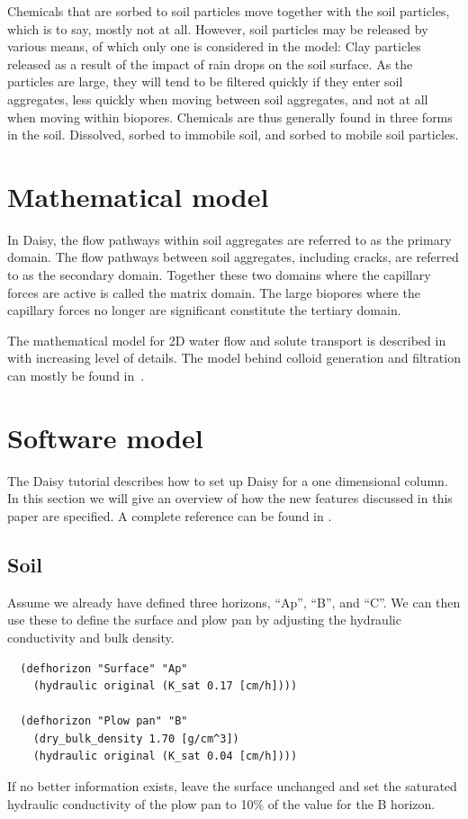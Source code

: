 \documentclass[a4paper]{article}
\begin{document}
Chemicals that are sorbed to soil particles move together with the
soil particles, which is to say, mostly not at all.  However, soil
particles may be released by various means, of which only one is
considered in the model: Clay particles released as a result of the
impact of rain drops on the soil surface.  As the particles are large,
they will tend to be filtered quickly if they enter soil aggregates,
less quickly when moving between soil aggregates, and not at all when
moving within biopores.  Chemicals are thus generally found in three
forms in the soil.  Dissolved, sorbed to immobile soil, and sorbed to
mobile soil particles.  

\section{Mathematical model}

In Daisy, the flow pathways within soil aggregates are referred to as
the primary domain.  The flow pathways between soil aggregates,
including cracks, are referred to as the secondary domain.  Together
these two domains where the capillary forces are active is called the
matrix domain.  The large biopores where the capillary forces no
longer are significant constitute the tertiary domain.

The mathematical model for 2D water flow and solute transport is
described in~\citet{mollerup2011,SAFIRD32,daisy2Ddnumerics} with
increasing level of details.  The model behind colloid generation and
filtration can mostly be found in~\citet{macro-colloid}.

\section{Software model}

The Daisy tutorial \citep{daisy-tut} describes how to set up Daisy for
a one dimensional column.  In this section we will give an overview of
how the new features discussed in this paper are specified. A complete
reference can be found in \citet{daisy-ref}.

\subsection{Soil}

Assume we already have defined three horizons, ``Ap'', ``B'', and
``C''.  We can then use these to define the surface and plow pan by
adjusting the hydraulic conductivity and bulk density.
\begin{verbatim}
  (defhorizon "Surface" "Ap"
    (hydraulic original (K_sat 0.17 [cm/h])))

  (defhorizon "Plow pan" "B"
    (dry_bulk_density 1.70 [g/cm^3])
    (hydraulic original (K_sat 0.04 [cm/h])))
\end{verbatim}
If no better information exists, leave the surface unchanged and set
the saturated hydraulic conductivity of the plow pan to 10\% of the
value for the B horizon.
\end{document}
